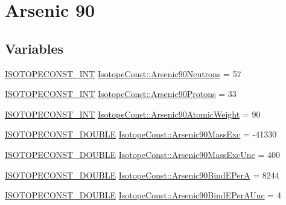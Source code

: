 \hypertarget{group___isotope_const-_arsenic-_as90}{}\section{Arsenic 90}
\label{group___isotope_const-_arsenic-_as90}
\subsection*{Variables}
\begin{DoxyCompactItemize}
\item 
\mbox{\hyperlink{group___isotope_const-_macros_ga5f18360b3e99483a35c32d789e62621c}{I\+S\+O\+T\+O\+P\+E\+C\+O\+N\+S\+T\+\_\+\+I\+NT}} \mbox{\hyperlink{group___isotope_const-_arsenic-_as90_gae78c9eb910d5f22149c9bced702c60bf}{Isotope\+Const\+::\+Arsenic90\+Neutrons}} = 57
\item 
\mbox{\hyperlink{group___isotope_const-_macros_ga5f18360b3e99483a35c32d789e62621c}{I\+S\+O\+T\+O\+P\+E\+C\+O\+N\+S\+T\+\_\+\+I\+NT}} \mbox{\hyperlink{group___isotope_const-_arsenic-_as90_ga19b7e2f8f799ca9e25feafbed69f2160}{Isotope\+Const\+::\+Arsenic90\+Protons}} = 33
\item 
\mbox{\hyperlink{group___isotope_const-_macros_ga5f18360b3e99483a35c32d789e62621c}{I\+S\+O\+T\+O\+P\+E\+C\+O\+N\+S\+T\+\_\+\+I\+NT}} \mbox{\hyperlink{group___isotope_const-_arsenic-_as90_gae921df23e216ad75ee4d28ced869cd00}{Isotope\+Const\+::\+Arsenic90\+Atomic\+Weight}} = 90
\item 
\mbox{\hyperlink{group___isotope_const-_macros_ga8f45a7272ce02c0b4c65c44636ed719a}{I\+S\+O\+T\+O\+P\+E\+C\+O\+N\+S\+T\+\_\+\+D\+O\+U\+B\+LE}} \mbox{\hyperlink{group___isotope_const-_arsenic-_as90_ga244a76ddfddede8a103f9568e44e1477}{Isotope\+Const\+::\+Arsenic90\+Mass\+Exc}} = -\/41330
\item 
\mbox{\hyperlink{group___isotope_const-_macros_ga8f45a7272ce02c0b4c65c44636ed719a}{I\+S\+O\+T\+O\+P\+E\+C\+O\+N\+S\+T\+\_\+\+D\+O\+U\+B\+LE}} \mbox{\hyperlink{group___isotope_const-_arsenic-_as90_gaee6644d4121248728e51b264a8fe56c3}{Isotope\+Const\+::\+Arsenic90\+Mass\+Exc\+Unc}} = 400
\item 
\mbox{\hyperlink{group___isotope_const-_macros_ga8f45a7272ce02c0b4c65c44636ed719a}{I\+S\+O\+T\+O\+P\+E\+C\+O\+N\+S\+T\+\_\+\+D\+O\+U\+B\+LE}} \mbox{\hyperlink{group___isotope_const-_arsenic-_as90_ga3d9ecb034b32e8eba7824dc4d19ab23a}{Isotope\+Const\+::\+Arsenic90\+Bind\+E\+PerA}} = 8244
\item 
\mbox{\hyperlink{group___isotope_const-_macros_ga8f45a7272ce02c0b4c65c44636ed719a}{I\+S\+O\+T\+O\+P\+E\+C\+O\+N\+S\+T\+\_\+\+D\+O\+U\+B\+LE}} \mbox{\hyperlink{group___isotope_const-_arsenic-_as90_gaf748038473d98170992b37dfc806acff}{Isotope\+Const\+::\+Arsenic90\+Bind\+E\+Per\+A\+Unc}} = 4

\end{DoxyCompactItemize}

